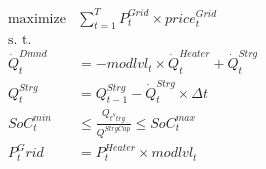 \documentclass[11pt]{article}
\begin{document}
\begin{align}
	\text{maximize} & \sum_{t=1}^T{P_t^{Grid} \times price_t^{Grid}}\\
	\text{s. t.} \nonumber \\
	\dot Q_t^{Dmnd} &= -modlvl_t \times \dot Q_t^{Heater} + \dot Q_t^{Strg} \\
	Q_t^{Strg} &= Q_{t-1}^{Strg} - \dot Q_t^{Strg} \times \Delta t \\
	SoC_t^{min} &\leq \frac{Q_{t^Strg}}{Q^{StrgCap}} \leq SoC_t^{max} \\
	P_t^Grid &= P_t^{Heater} \times modlvl_t
\end{align}
\end{document}
